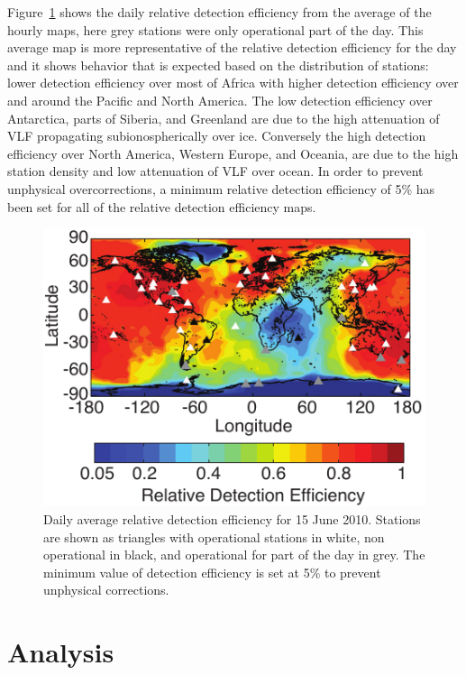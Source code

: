 Figure~\ref{efficiency:fig:Daily_Map} shows the daily relative detection efficiency from the average of the hourly maps, here grey stations were only operational part of the day.
This average map is more representative of the relative detection efficiency for the day and it shows behavior that is expected based on the distribution of stations: lower detection efficiency over most of Africa with higher detection efficiency over and around the Pacific and North America.
The low detection efficiency over Antarctica, parts of Siberia, and Greenland are due to the high attenuation of VLF propagating subionospherically over ice.
Conversely the high detection efficiency over North America, Western Europe, and Oceania, are due to the high station density and low attenuation of VLF over ocean.
In order to prevent unphysical overcorrections, a minimum relative detection efficiency of 5\% has been set for all of the relative detection efficiency maps.

\begin{figure}[ht!]
   \centering
\noindent\includegraphics[scale=1]{efficiency/Figures/2012RS005049-p7.pdf}
   \caption{Daily average relative detection efficiency for 15 June 2010.
Stations are shown as triangles with operational stations in white, non operational in black, and operational for part of the day in grey.
The minimum value of detection efficiency is set at 5\% to prevent unphysical corrections.}
   \label{efficiency:fig:Daily_Map}
\end{figure}

\section{Analysis}

